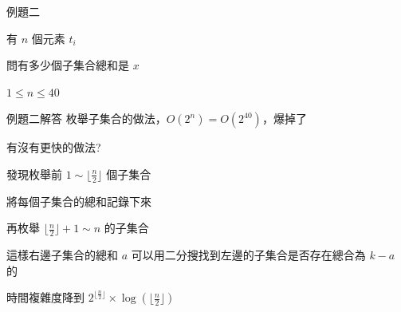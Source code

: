 \begin{frame}{例題二}
    \begin{problem}
        有 $n$ 個元素 $t_i$

        問有多少個子集合總和是 $x$

        $1 \le n \le 40$
    \end{problem}
\end{frame}

\begin{frame}{例題二解答}
    枚舉子集合的做法，$O(2^n) = O(2^{40})$，爆掉了

    有沒有更快的做法?\pause

    發現枚舉前 $1 \sim \lfloor \frac{n}{2} \rfloor$ 個子集合

    將每個子集合的總和記錄下來

    再枚舉 $\lfloor \frac{n}{2} \rfloor + 1 \sim n$ 的子集合

    這樣右邊子集合的總和 $a$ 可以用二分搜找到左邊的子集合是否存在總合為 $k-a$ 的\pause

    時間複雜度降到 $2^{\lfloor \frac{n}{2} \rfloor} \times \log (\lfloor \frac{n}{2} \rfloor)$
\end{frame}